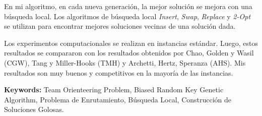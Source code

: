 \bigskip

En mi algoritmo, en cada nueva generación, la mejor solución se mejora con una búsqueda local. Los algoritmos de búsqueda local \textit{Insert}, \textit{Swap}, \textit{Replace} y \textit{2-Opt} se utilizan para encontrar mejores soluciones vecinas de una solución dada.

\bigskip

Los experimentos computacionales se realizan en instancias estándar. Luego, estos resultados se compararon con los resultados obtenidos por Chao, Golden y Wasil \cite{ChaoGoldenWasil} (CGW), Tang y Miller-Hooks \cite{TangMillerHooks} (TMH) y Archetti, Hertz, Speranza \cite{ArchettiHertzSperanza} (AHS). Mis resultados son muy buenos y competitivos en la mayoría de las instancias.

\bigskip

\noindent\textbf{Keywords:} Team Orienteering Problem, Biased Random Key Genetic Algorithm, Problema de Enrutamiento, Búsqueda Local, Construcción de Soluciones Golosas.